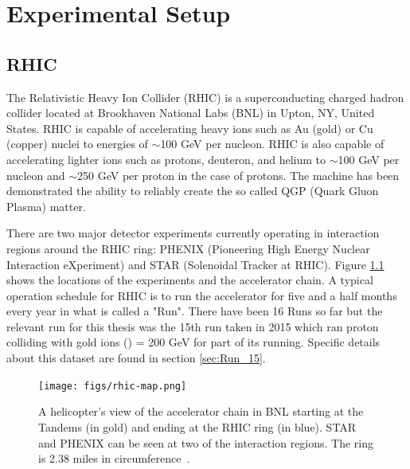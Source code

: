 \chapter{Experimental Setup}
\section{RHIC}
The Relativistic Heavy Ion Collider (RHIC) is a superconducting charged hadron collider located at Brookhaven National Labs (BNL) in Upton, NY, United States. RHIC is capable of accelerating heavy ions such as Au (gold) or Cu (copper) nuclei to energies of $\sim	$100 GeV per nucleon. RHIC is also capable of accelerating lighter ions such as protons, deuteron, and helium to $\sim	$100 GeV per nucleon and $\sim	$250 GeV per proton in the case of protons. The machine has been demonstrated the ability to reliably create the so called QGP (Quark Gluon Plasma) matter.

There are two major detector experiments currently operating in interaction regions around the RHIC ring: PHENIX (Pioneering High Energy Nuclear Interaction eXperiment) and STAR (Solenoidal Tracker at RHIC). Figure \ref{fig:rhic_heli_photo} shows the locations of the experiments and the accelerator chain. A typical operation schedule for RHIC is to run the accelerator for five and a half months every year in what is called a "Run". There have been 16 Runs so far but the relevant run for this thesis was the 15th run taken in 2015 which ran proton colliding with gold ions (\pau) \sqsn = 200 GeV for part of its running. Specific details about this dataset are found in section \ref{sec:Run_15}.

\begin{figure}[!ht]
\begin{center}
\texttt{[image: figs/rhic-map.png]}
\caption{A helicopter's view of the accelerator chain in BNL starting at the Tandems (in gold) and ending at the RHIC ring (in blue). STAR and PHENIX can be seen at two of the interaction regions. The ring is 2.38 miles in circumference~\cite{Tannenbaum:2013wkn}.}
\label{fig:rhic_heli_photo}
\end{center}
\end{figure}

